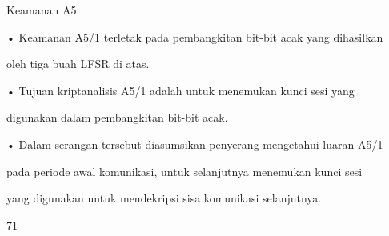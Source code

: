 \documentclass{article}
\begin{document}

Keamanan A5

• Keamanan A5/1 terletak pada pembangkitan bit-bit acak yang dihasilkan 

oleh tiga buah LFSR di atas. 

• Tujuan kriptanalisis A5/1 adalah untuk menemukan kunci sesi yang 

digunakan dalam pembangkitan bit-bit acak. 

• Dalam serangan tersebut diasumsikan penyerang mengetahui luaran A5/1 

pada periode awal komunikasi, untuk selanjutnya menemukan kunci sesi 

yang digunakan untuk mendekripsi sisa komunikasi selanjutnya. 

71
\end{document}
